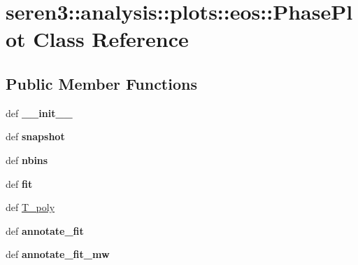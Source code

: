 \hypertarget{classseren3_1_1analysis_1_1plots_1_1eos_1_1PhasePlot}{
\section{seren3::analysis::plots::eos::PhasePlot Class Reference}
\label{classseren3_1_1analysis_1_1plots_1_1eos_1_1PhasePlot}
}
\subsection*{Public Member Functions}
\begin{DoxyCompactItemize}
\item 
\hypertarget{classseren3_1_1analysis_1_1plots_1_1eos_1_1PhasePlot_ab80ebbbd32a97b65370627b6f29dc087}{
def {\bfseries \_\-\_\-init\_\-\_\-}}
\label{classseren3_1_1analysis_1_1plots_1_1eos_1_1PhasePlot_ab80ebbbd32a97b65370627b6f29dc087}

\item 
\hypertarget{classseren3_1_1analysis_1_1plots_1_1eos_1_1PhasePlot_aa41041f23efbafa90bc0bb9d49b36f31}{
def {\bfseries snapshot}}
\label{classseren3_1_1analysis_1_1plots_1_1eos_1_1PhasePlot_aa41041f23efbafa90bc0bb9d49b36f31}

\item 
\hypertarget{classseren3_1_1analysis_1_1plots_1_1eos_1_1PhasePlot_a43aad60044f8c4bf0f1bb39c6cafdda7}{
def {\bfseries nbins}}
\label{classseren3_1_1analysis_1_1plots_1_1eos_1_1PhasePlot_a43aad60044f8c4bf0f1bb39c6cafdda7}

\item 
\hypertarget{classseren3_1_1analysis_1_1plots_1_1eos_1_1PhasePlot_a2ef8da06ef783122b6c97ed53916e6e6}{
def {\bfseries fit}}
\label{classseren3_1_1analysis_1_1plots_1_1eos_1_1PhasePlot_a2ef8da06ef783122b6c97ed53916e6e6}

\item 
def \hyperlink{classseren3_1_1analysis_1_1plots_1_1eos_1_1PhasePlot_ab25d29e63ab8b99887c1b3bbe258614e}{T\_\-poly}
\item 
\hypertarget{classseren3_1_1analysis_1_1plots_1_1eos_1_1PhasePlot_a0b2be02145a2635eb8fff3c89cb906ec}{
def {\bfseries annotate\_\-fit}}
\label{classseren3_1_1analysis_1_1plots_1_1eos_1_1PhasePlot_a0b2be02145a2635eb8fff3c89cb906ec}

\item 
\hypertarget{classseren3_1_1analysis_1_1plots_1_1eos_1_1PhasePlot_a95b55a3c03412f63f499415e70f426c8}{
def {\bfseries annotate\_\-fit\_\-mw}}
\label{classseren3_1_1analysis_1_1plots_1_1eos_1_1PhasePlot_a95b55a3c03412f63f499415e70f426c8}


\end{DoxyCompactItemize}
